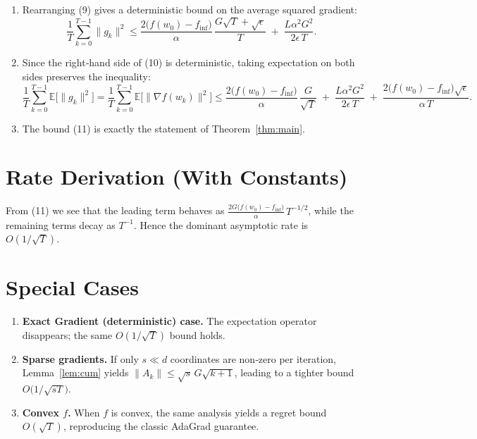 \documentclass{article}
\newcommand{\E}{\mathbb{E}}
\begin{document}
\begin{enumerate}
\item[Step 9.] Rearranging (9) gives a deterministic bound on the
average squared gradient:
\[
\frac{1}{T}\sum_{k=0}^{T-1}\|g_k\|^{2}
\le
\frac{2\bigl(f(w_0)-f_{\inf}\bigr)}{\alpha}\,
\frac{G\sqrt{T}+\sqrt{\epsilon}}{T}
\;+\;
\frac{L\alpha^{2}G^{2}}{2\epsilon\,T}.
\tag{10}
\]

\item[Step 10.] %
Since the right‑hand side of (10) is deterministic, taking expectation on
both sides preserves the inequality:
\[
\frac{1}{T}\sum_{k=0}^{T-1}\E\!\bigl[\|g_k\|^{2}\bigr]
=
\frac{1}{T}\sum_{k=0}^{T-1}\E\!\bigl[\|\nabla f(w_k)\|^{2}\bigr]
\le
\frac{2\bigl(f(w_0)-f_{\inf}\bigr)}{\alpha}\,
\frac{G}{\sqrt{T}}
\;+\;
\frac{L\alpha^{2}G^{2}}{2\epsilon\,T}
\;+\;
\frac{2\bigl(f(w_0)-f_{\inf}\bigr)\sqrt{\epsilon}}{\alpha\,T}.
\tag{11}
\]

\item[Step 11.] The bound (11) is exactly the statement of Theorem~\ref{thm:main}.
\qedhere
\end{enumerate}

\section*{Rate Derivation (With Constants)}
From (11) we see that the leading term behaves as
$\displaystyle \frac{2G\bigl(f(w_0)-f_{\inf}\bigr)}{\alpha}\,T^{-1/2}$,
while the remaining terms decay as $T^{-1}$. Hence the dominant
asymptotic rate is $O(1/\sqrt{T})$.

\section*{Special Cases}
\begin{enumerate}
\item \textbf{Exact Gradient (deterministic) case.}
   The expectation operator disappears; the same $O(1/\sqrt{T})$ bound holds.
\item \textbf{Sparse gradients.}
   If only $s\ll d$ coordinates are non‑zero per iteration,
   Lemma~\ref{lem:cum} yields $\|A_k\|\le \sqrt{s}\,G\sqrt{k+1}$,
   leading to a tighter bound $O\!\bigl(1/\sqrt{sT}\bigr)$.
\item \textbf{Convex $f$.}
   When $f$ is convex, the same analysis yields a regret bound
   $O(\sqrt{T})$, reproducing the classic AdaGrad guarantee.
\end{enumerate}
\end{document}
